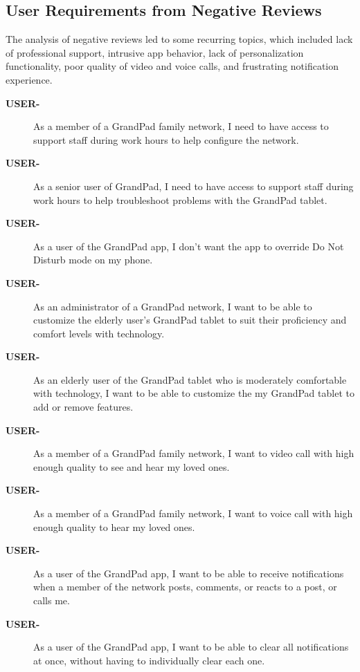 \subsection*{User Requirements from Negative Reviews}

The analysis of negative reviews led to some recurring topics, which included
    lack of professional support,
    intrusive app behavior,
    lack of personalization functionality,
    poor quality of video and voice calls,
    and frustrating notification experience.

\begin{description}
    \item[\textbf{USER-\showmycounter}]
        As a member of a GrandPad family network, I need to have access to
            support staff during work hours to help configure the network.
    \item[\textbf{USER-\showmycounter}]
        As a senior user of GrandPad, I need to have access to support staff
            during work hours to help troubleshoot problems with the GrandPad
            tablet.
    \item[\textbf{USER-\showmycounter}]
        As a user of the GrandPad app, I don't want the app to override
            Do Not Disturb mode on my phone.
    \item[\textbf{USER-\showmycounter}]
        As an administrator of a GrandPad network, I want to be able to
            customize the elderly user's GrandPad tablet to suit their
            proficiency and comfort levels with technology.
    \item[\textbf{USER-\showmycounter}]
        As an elderly user of the GrandPad tablet who is moderately comfortable
            with technology, I want to be able to customize the my GrandPad
            tablet to add or remove features.
    \item[\textbf{USER-\showmycounter}]
        As a member of a GrandPad family network, I want to video call with high
            enough quality to see and hear my loved ones.
    \item[\textbf{USER-\showmycounter}]
        As a member of a GrandPad family network, I want to voice call with high
            enough quality to hear my loved ones.
    \item[\textbf{USER-\showmycounter}]
        As a user of the GrandPad app, I want to be able to receive
            notifications when a member of the network posts, comments, or
            reacts to a post, or calls me.
    \item[\textbf{USER-\showmycounter}]
        As a user of the GrandPad app, I want to be able to clear all
            notifications at once, without having to individually clear each
            one.
\end{description}

